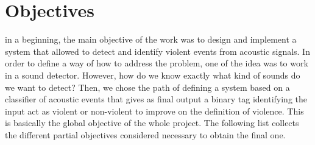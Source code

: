 	
	
\section{Objectives}
\label{section:objectives}

	in a beginning, the main objective of the work was to design and implement a system that allowed to detect and identify violent events from acoustic signals. In order to define a way of how to address the problem, one of the idea was to work in a sound detector. However, how do we know exactly what kind of sounds do we want to detect? Then, we chose the path of defining a system based on a classifier of acoustic events that gives as final output a binary tag identifying the input act as violent or non-violent to improve on the definition of violence. This is basically the global objective of the whole project. The following list collects the different partial objectives considered necessary to obtain the final one.
	
